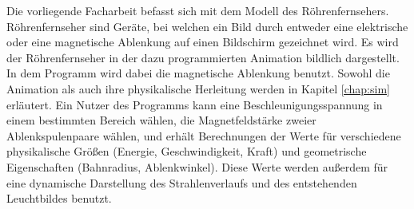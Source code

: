 Die vorliegende Facharbeit befasst sich mit dem Modell des Röhrenfernsehers.
Röhrenfernseher sind Geräte, bei welchen ein Bild durch entweder eine elektrische oder eine magnetische Ablenkung auf einen Bildschirm gezeichnet wird.
Es wird der Röhrenfernseher in der dazu programmierten Animation bildlich dargestellt.
In dem Programm wird dabei die magnetische Ablenkung benutzt.
Sowohl die Animation als auch ihre physikalische Herleitung werden in Kapitel \ref{chap:sim} erläutert.
Ein Nutzer des Programms kann eine Beschleunigungsspannung in einem bestimmten Bereich wählen, die Magnetfeldstärke zweier Ablenkspulenpaare wählen, und erhält Berechnungen der Werte für verschiedene physikalische Größen (Energie, Geschwindigkeit, Kraft) und geometrische Eigenschaften (Bahnradius, Ablenkwinkel).
Diese Werte werden außerdem für eine dynamische Darstellung des Strahlenverlaufs und des entstehenden Leuchtbildes benutzt.

